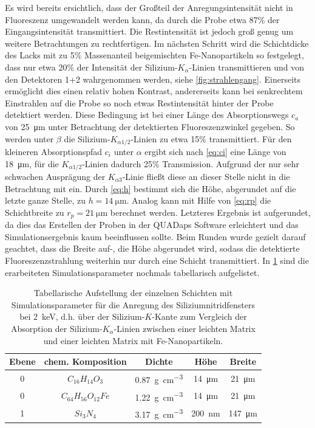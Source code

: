 Es wird bereits ersichtlich, dass der Großteil der Anregungsintensität nicht in Fluoreszenz umgewandelt werden kann, da durch die Probe etwa 87\% der Eingangsintensität transmittiert. Die Restintensität ist jedoch groß genug um weitere Betrachtungen zu rechtfertigen. \newline
Im nächsten Schritt wird die Schichtdicke des Lacks mit zu 5\% Massenanteil beigemischten Fe-Nanopartikeln so festgelegt, dass nur etwa 20\% der Intensität der Silizium-$K_{\alpha}$-Linien transmittieren und von den Detektoren 1+2 wahrgenommen werden, siehe \cref{fig:strahlengang}. Einerseits ermöglicht dies einen relativ hohen Kontrast, andererseits kann bei senkrechtem Einstrahlen auf die Probe so noch etwas Restintensität hinter der Probe detektiert werden. Diese Bedingung ist bei einer Länge des Absorptionswegs $c_a$ von \SI{25}{\micro\meter} unter Betrachtung der detektierten Fluoreszenzwinkel gegeben. So werden unter $\beta$ die Silizium-$K_{{\alpha}1/2}$-Linien zu etwa 15\% transmittiert. Für den kleineren Absorptionspfad $c_i$ unter $\alpha$ ergibt sich nach \cref{eq:ci} eine Länge von \SI{18}{\micro\meter}, für die $K_{{\alpha}1/2}$-Linien dadurch 25\% Transmission. Aufgrund der nur sehr schwachen Ausprägung der $K_{{\alpha}3}$-Linie fließt diese an dieser Stelle nicht in die Betrachtung mit ein. Durch \cref{eq:h} bestimmt sich die Höhe, abgerundet auf die letzte ganze Stelle, zu $h = \SI{14}{\micro\meter}$. Analog kann mit Hilfe von \cref{eq:rp} die Schichtbreite zu $r_p = \SI{21}{\micro\meter}$ berechnet werden. Letzteres Ergebnis ist aufgerundet, da dies das Erstellen der Proben in der QUADaps Software erleichtert und das Simulationsergebnis kaum beeinflussen sollte. Beim Runden wurde gezielt darauf geachtet, dass die Breite auf-, die Höhe abgerundet wird, sodass die detektierte Fluoreszenzstrahlung weiterhin nur durch eine Schicht transmittiert. In \cref{tab:si_fe} sind die erarbeiteten Simulationsparameter nochmals tabellarisch aufgelistet.
 \begin{table}[H]
 \centering
 \begin{tabular}{|c|c|c|c|c|} \hline
  Ebene & chem. Komposition & Dichte & Höhe & Breite	\\ \hline
  0 & $C_{16}H_{14}O_{3}$ 		& \SI{0.87}{\gram\per\cubic\centi\meter}	& \SI{14}{\micro\meter} & \SI{21}{\micro\meter} \\ \hline
  0 & $C_{64}H_{56}O_{12}Fe$	& \SI{1.22}{\gram\per\cubic\centi\meter}	& \SI{14}{\micro\meter} & \SI{21}{\micro\meter} \\ \hline
  1 & $Si_{3}N_{4}$				& \SI{3.17}{\gram\per\cubic\centi\meter}	& \SI{200}{\nano\meter} & \SI{147}{\micro\meter} \\ \hline
 \end{tabular}
   \caption{Tabellarische Aufstellung der einzelnen Schichten mit Simulationsparameter für die Anregung des Siliziumnitridfensters bei \SI{2}{\kilo\electronvolt}, d.h. über der Silizium-$K$-Kante zum Vergleich der Absorption der Silizium-$K_{\alpha}$-Linien zwischen einer leichten Matrix und einer leichten Matrix mit Fe-Nanopartikeln.}
 \label{tab:si_fe}
 \end{table}
